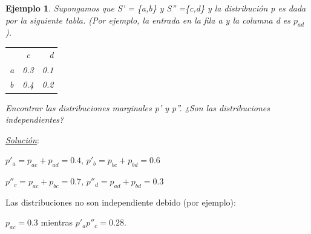 \documentclass{beamer}
\theoremstyle{plain}
\theoremstyle{example}
\theoremstyle{example}
\newtheorem{ejemplo} [Ejemplo] {Ejemplo}
\begin{document}
\begin{frame}  \footnotesize

\begin{ejemplo}

Supongamos que S' = \{a,b\} y S'' =\{c,d\} y la distribución p es dada por la siguiente tabla. (Por ejemplo, la entrada en la fila a y la columna d es $p_{ad}$). \begin{center}
 \begin{tabular}{ l c r }
         & c & d \\
   a & 0.3 & 0.1 \\
   b & 0.4 & 0.2 \\
 \end{tabular}
\end{center}

Encontrar las distribuciones marginales p' y p''. ¿Son las distribuciones independientes?\\
\end{ejemplo}
\pause

\textit{\underline{Solución}}:\\
\begin{center} $p'_a = p_{ac} + p_{ad} =0.4$,  $p'_b = p_{bc} + p_{bd} =0.6$\end{center}

\begin{center}$p''_c =p_{ac} + p_{bc}	=0.7$,  $p''_d =p_{ad} + p_{bd}	=0.3$\end{center}

Las distribuciones no son independiente debido (por ejemplo):
\begin{center}$p_{ac}	= 0.3$ mientras	$p'_a p''_c = 0.28$.\end{center}

\end{frame} 
\end{document}
